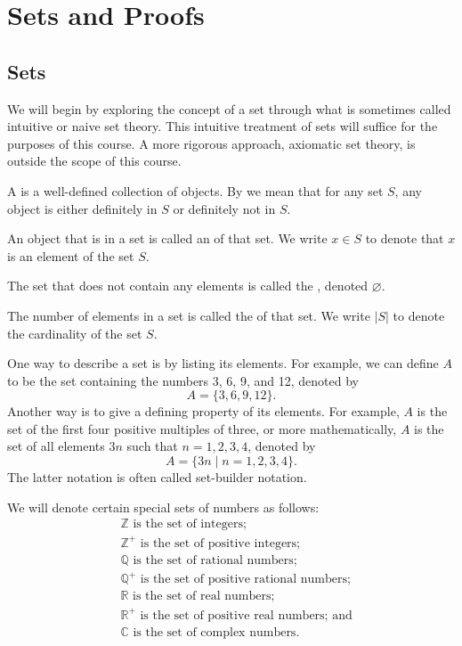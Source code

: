 \chapter{Sets and Proofs}

\section{Sets}

We will begin by exploring the concept of a set through what is sometimes called intuitive or naive set theory. This intuitive treatment of sets will suffice for the purposes of this course. A more rigorous approach, axiomatic set theory, is outside the scope of this course.

\begin{defn}
A  is a well-defined collection of objects. By  we mean that for any set $ S $, any object is either definitely in $ S $ or definitely not in $ S $.

An object that is in a set is called an  of that set. We write $ x\in S $ to denote that $ x $ is an element of the set $ S $.

The set that does not contain any elements is called the , denoted $ \varnothing $.

The number of elements in a set is called the  of that set. We write $ \lvert S\rvert $ to denote the cardinality of the set $ S $.
\end{defn}

One way to describe a set is by listing its elements. For example, we can define $ A $ to be the set containing the numbers 3, 6, 9, and 12, denoted by
\begin{equation*}
    A=\{3,6,9,12\}.
\end{equation*}
Another way is to give a defining property of its elements. For example, $ A $ is the set of the first four positive multiples of three, or more mathematically, $ A $ is the set of all elements $ 3n $ such that $ n=1,2,3,4 $, denoted by
\begin{equation*}
    A=\{3n\mid n=1,2,3,4\}.
\end{equation*}
The latter notation is often called set-builder notation.

We will denote certain special sets of numbers as follows:
\begin{align*}
    &\mathbb{Z} \text{ is the set of integers;} \\
    &\mathbb{Z}^+ \text{ is the set of positive integers;} \\
    &\mathbb{Q} \text{ is the set of rational numbers;} \\
    &\mathbb{Q}^+ \text{ is the set of positive rational numbers;} \\
    &\mathbb{R} \text{ is the set of real numbers;} \\
    &\mathbb{R}^+ \text{ is the set of positive real numbers; and} \\
    &\mathbb{C} \text{ is the set of complex numbers.}
\end{align*}

